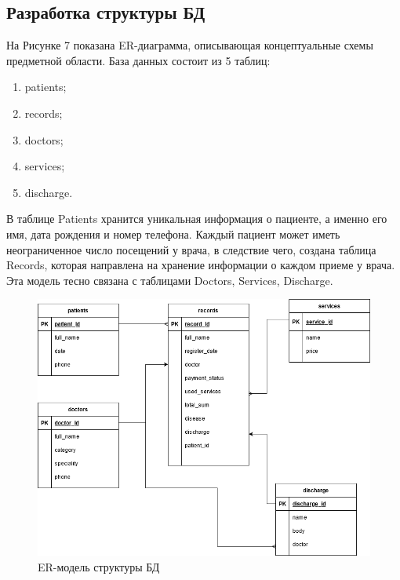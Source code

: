 \documentclass[a4paper, 10pt]{article}
\begin{document}
	 \subsection{Разработка структуры БД}
	 На Рисунке 7 показана ER-диаграмма, описывающая концептуальные схемы предметной области. База данных состоит из 5 таблиц: 
	 \begin{enumerate}
	 	\item patients;
	 	\item records;
	 	\item doctors;
	 	\item services;
	 	\item discharge.
	 \end{enumerate}
 	В таблице Patients хранится уникальная информация о пациенте, а именно его имя, дата рождения и номер телефона. Каждый пациент может иметь неограниченное число посещений у врача, в следствие чего, создана таблица Records, которая направлена на хранение информации о каждом приеме у врача. Эта модель тесно связана с таблицами Doctors, Services, Discharge.
	\begin{figure}[h!]
		\centering
		\includegraphics[scale=0.6]{er-diagram}
		\centering\caption{ER-модель структуры БД}
	\end{figure}
	\clearpage
	\newpage
\end{document}
